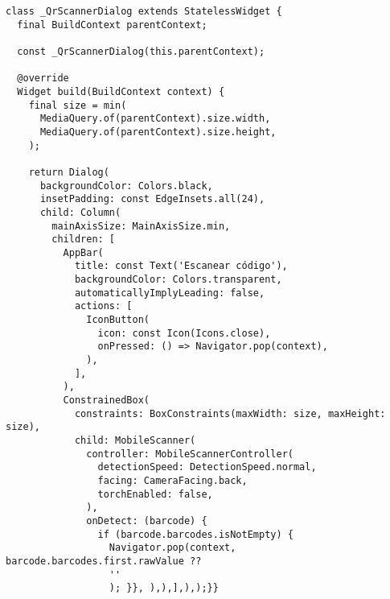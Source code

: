 \begin{verbatim}
class _QrScannerDialog extends StatelessWidget {
  final BuildContext parentContext;

  const _QrScannerDialog(this.parentContext);

  @override
  Widget build(BuildContext context) {
    final size = min(
      MediaQuery.of(parentContext).size.width,
      MediaQuery.of(parentContext).size.height,
    );

    return Dialog(
      backgroundColor: Colors.black,
      insetPadding: const EdgeInsets.all(24),
      child: Column(
        mainAxisSize: MainAxisSize.min,
        children: [
          AppBar(
            title: const Text('Escanear código'),
            backgroundColor: Colors.transparent,
            automaticallyImplyLeading: false,
            actions: [
              IconButton(
                icon: const Icon(Icons.close),
                onPressed: () => Navigator.pop(context),
              ),
            ],
          ),
          ConstrainedBox(
            constraints: BoxConstraints(maxWidth: size, maxHeight: size),
            child: MobileScanner(
              controller: MobileScannerController(
                detectionSpeed: DetectionSpeed.normal,
                facing: CameraFacing.back,
                torchEnabled: false,
              ),
              onDetect: (barcode) {
                if (barcode.barcodes.isNotEmpty) {
                  Navigator.pop(context, barcode.barcodes.first.rawValue ?? 
                  ''
                  ); }}, ),),],),);}}
\end{verbatim}










